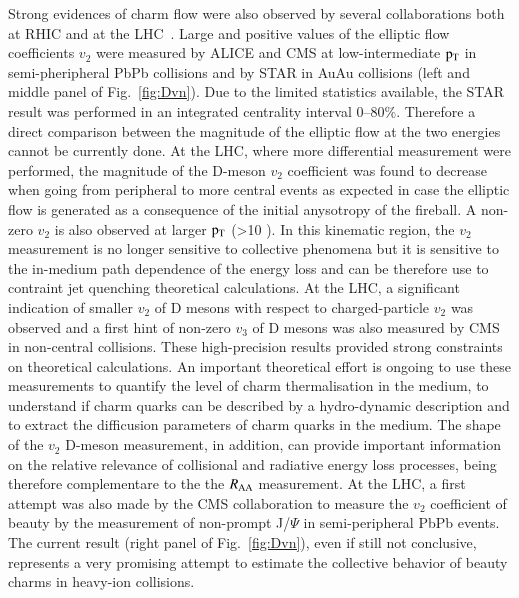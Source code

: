 \documentclass{webofc}
\begin{document}
Strong evidences of charm flow were also observed by several collaborations both at RHIC and at the LHC~\cite{flow1,flow2,flow3}. Large and positive values of the elliptic flow coefficients $v_{2}$ were measured by ALICE 
and CMS at low-intermediate $\rm p_{\rm T} $ in semi-pheripheral PbPb collisions and by STAR in AuAu collisions (left and middle panel of Fig.~\ref{fig:Dvn}). 
Due to the limited statistics available, the STAR result was performed in an integrated 
centrality interval 0--80$\%$. Therefore a direct comparison between the magnitude of the elliptic flow at the two energies cannot be currently done.
At the LHC, where more differential measurement were performed, the magnitude of the D-meson $v_{2}$ coefficient was found to decrease when going from peripheral to more central events as expected 
in case the elliptic flow is generated as a consequence of the initial anysotropy of the fireball.  A non-zero $v_{2}$ is also observed at larger $\rm p_{\rm T} $ (>10 \GeVc). In this kinematic region, the $v_{2}$ measurement is no
longer sensitive to collective phenomena but it is sensitive to the in-medium path dependence of the energy loss and can be therefore use to contraint jet quenching theoretical calculations. At the LHC, a significant indication 
of smaller $v_{2}$ of D mesons with respect to charged-particle $v_{2}$ was observed and a first hint of non-zero $v_{3}$ of D mesons was also measured by CMS in non-central collisions. 
These high-precision results provided strong constraints on theoretical calculations. An important theoretical effort is ongoing to use these measurements to quantify the level of charm thermalisation in the medium, 
to understand if charm quarks can be described by a hydro-dynamic description and to extract the difficusion parameters of charm quarks in the medium. The shape of the $v_{2}$ D-meson measurement, in addition, 
can provide important information on the relative relevance of collisional and radiative energy loss processes, being therefore complementare to the the $R_{\mathrm{AA}}$ measurement. 
At the LHC, a first attempt was also made by the CMS collaboration to measure the $v_{2}$  coefficient of beauty by the measurement of non-prompt J/$\Psi$ in semi-peripheral PbPb events. 
The current result (right panel of Fig.~\ref{fig:Dvn}), even if still not conclusive, represents a very promising attempt to estimate the collective behavior of beauty charms in heavy-ion collisions. 
\end{document}
